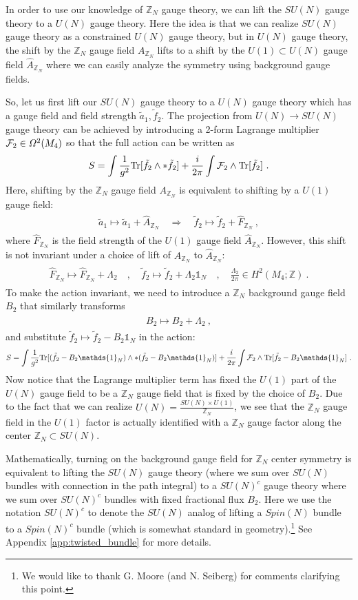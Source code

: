 \documentclass[11pt]{article}
\newcommand{\eq}[1]{\begin{align}\begin{split}#1\end{split}\end{align}}
\newcommand{\twopi}[1]{{\frac{#1}{2\pi}}}
\def\Tr{{\rm Tr}}
\def\CF {{\cal F}}
\def\IZ{{\mathbb{Z}}}
\def\IZN{{\mathbb{Z}_N}}
\def\hatF{{\widehat{F}}}
\begin{document}
In order to use our knowledge of $\IZ_N$ gauge theory, we can lift the $SU(N)$ gauge theory to a $U(N)$ gauge theory. Here the idea is that we can realize $SU(N)$ gauge theory as a constrained $U(N)$ gauge theory, but in $U(N)$ gauge theory,  
the shift by the $\IZ_N$ gauge field $A_{\IZ_N}$ lifts to a shift by the $U(1)\subset U(N)$ gauge field $\hat{A}_{\IZ_N}$ where we can easily analyze the symmetry using background gauge fields.

So, let us first lift our $SU(N)$ gauge theory to a $U(N)$ gauge theory which has a gauge field and field strength $\tilde{a}_1,\tilde{f}_2$. 
The projection from $U(N)\to SU(N)$ gauge theory can be achieved by introducing a 2-form Lagrange multiplier $\CF_2 \in \Omega^2(M_4)$ so that the full action can be written as  
\eq{
S=\int \frac{1}{g^2}\Tr[\tilde{f}_2\wedge \ast\tilde{f}_2]+\frac{i}{2\pi} \int \CF_2 \wedge \Tr[\tilde{f}_2]~.
}
Here, shifting by the $\IZ_N$ gauge field $A_{\IZ_N}$ is equivalent to shifting by a $U(1)$ gauge field:
 \eq{
\tilde{a}_1\longmapsto \tilde{a}_1 +\hat{A}_{\IZ_N}\quad\Rightarrow \quad \tilde{f}_2\longmapsto\tilde{f}_2+\hatF_{\IZ_N}~,
}
where $\hatF_\IZN$ is the field strength of the $U(1)$ gauge field $\hat{A}_\IZN$. 
However, this shift is not invariant under a choice of lift of $A_\IZN$ to $\hat{A}_\IZN$:
\eq{
\hatF_{\IZ_N}\longmapsto \hatF_{\IZ_N}+\Lambda_2\quad,\quad \tilde{f}_2\longmapsto \tilde{f}_2+\Lambda_2 \mathds{1}_N\quad, \quad \twopi{\Lambda_2}\in H^2(M_4;\IZ)~. 
}
To make the action invariant, we need to introduce a $\IZ_N$ background gauge field $B_2$ that similarly transforms 
\eq{
B_2\longmapsto B_2+\Lambda_2~,
}
and substitute $\tilde{f}_2\longmapsto\tilde{f}_2-B_2\mathds{1}_N$ in the action:
\eq{
S=\int \frac{1}{g^2}\Tr[(\tilde{f}_2-B_2\mathds{1}_N)\wedge \ast (\tilde{f}_2-B_2\mathds{1}_N)]+ \frac{i}{2\pi} \int \CF_2 \wedge\Tr[\tilde{f}_2-B_2\mathds{1}_N]~.
}
Now notice that the Lagrange multiplier term has fixed the $U(1)$ part of the $U(N)$ gauge field to be a $\IZ_N$ gauge field that is fixed by the choice of $B_2$. Due to the fact that we can realize $U(N)=\frac{SU(N)\times U(1)}{\IZ_N}$, we see that the $\IZ_N$ gauge field in the $U(1)$ factor is actually identified with a $\IZ_N$ gauge factor along the center $\IZ_N\subset SU(N)$. 

Mathematically, turning on the background gauge field for $\IZ_N$ center symmetry is equivalent to lifting the $SU(N)$ gauge theory  (where we sum over $SU(N)$ bundles with connection in the path integral) to a $SU(N)^c$ gauge theory where we sum over $SU(N)^c$ bundles with fixed fractional flux $B_2$. Here we use the notation $SU(N)^c$ to denote the $SU(N)$ analog of lifting a $Spin(N)$ bundle to a $Spin(N)^c$ bundle (which is somewhat standard in geometry).\footnote{We would like to thank G. Moore (and N. Seiberg) for comments clarifying this point.} See  Appendix \ref{app:twisted_bundle} for more details. 
\end{document}
